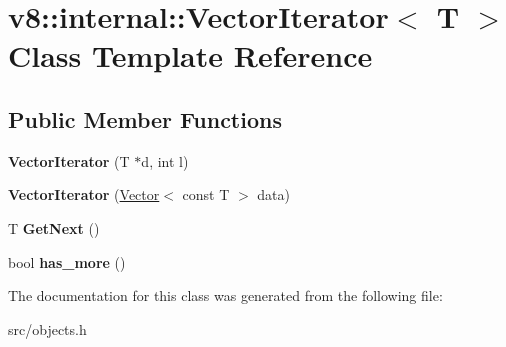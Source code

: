 \hypertarget{classv8_1_1internal_1_1_vector_iterator}{}\section{v8\+:\+:internal\+:\+:Vector\+Iterator$<$ T $>$ Class Template Reference}
\label{classv8_1_1internal_1_1_vector_iterator}
\subsection*{Public Member Functions}
\begin{DoxyCompactItemize}
\item 
\hypertarget{classv8_1_1internal_1_1_vector_iterator_a5721bb81564089949c1cea330858f659}{}{\bfseries Vector\+Iterator} (T $\ast$d, int l)\label{classv8_1_1internal_1_1_vector_iterator_a5721bb81564089949c1cea330858f659}

\item 
\hypertarget{classv8_1_1internal_1_1_vector_iterator_a0dc4c9efcb9257f5f1f37c1e1af9aac8}{}{\bfseries Vector\+Iterator} (\hyperlink{classv8_1_1internal_1_1_vector}{Vector}$<$ const T $>$ data)\label{classv8_1_1internal_1_1_vector_iterator_a0dc4c9efcb9257f5f1f37c1e1af9aac8}

\item 
\hypertarget{classv8_1_1internal_1_1_vector_iterator_ac2c10a0c007bd377a35dc83553340a95}{}T {\bfseries Get\+Next} ()\label{classv8_1_1internal_1_1_vector_iterator_ac2c10a0c007bd377a35dc83553340a95}

\item 
\hypertarget{classv8_1_1internal_1_1_vector_iterator_a4599ae0ce6acfde5beddcd9943f721b7}{}bool {\bfseries has\+\_\+more} ()\label{classv8_1_1internal_1_1_vector_iterator_a4599ae0ce6acfde5beddcd9943f721b7}

\end{DoxyCompactItemize}


The documentation for this class was generated from the following file\+:\begin{DoxyCompactItemize}
\item 
src/objects.\+h\end{DoxyCompactItemize}
